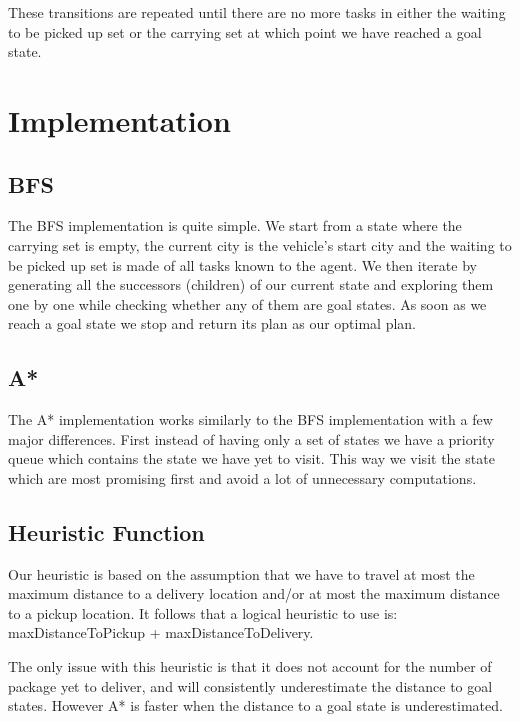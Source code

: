 \documentclass[11pt]{article}
\begin{document}
These transitions are repeated until there are no more tasks in either
the waiting to be picked up set or the carrying set at which point we
have reached a goal state.

\section{Implementation}

\subsection{BFS}


The BFS implementation is quite simple. We start from a state where
the carrying set is empty, the current city is the vehicle's start
city and the waiting to be picked up set is made of all tasks known to
the agent. We then iterate by generating all the successors (children)
of our current state and exploring them one by one while checking
whether any of them are goal states. As soon as we reach a goal state
we stop and return its plan as our optimal plan.

\subsection{A*}
The A* implementation works similarly to the BFS implementation with a
few major differences. First instead of having only a set of states
we have a priority queue which contains the state we have yet to
visit. This way we visit the state which are most promising first and
avoid a lot of unnecessary computations.

\subsection{Heuristic Function}


Our heuristic is based on the assumption that we have to travel at
most the maximum distance to a delivery location and/or at most the
maximum distance to a pickup location. It follows that a logical
heuristic to use is: maxDistanceToPickup + maxDistanceToDelivery.

The only issue with this heuristic is that it does not account for the
number of package yet to deliver, and will consistently underestimate
the distance to goal states. However A* is faster when the distance to
a goal state is underestimated.
\end{document}
